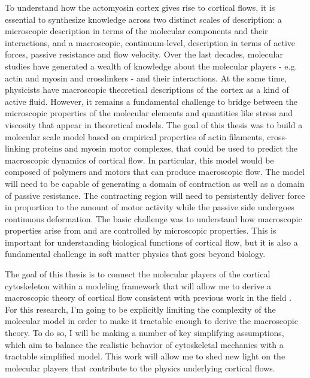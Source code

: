 To understand how the actomyosin cortex gives rise to cortical flows, it is essential to synthesize knowledge across two distinct scales of description: a microscopic description in terms of the molecular components and their interactions, and a macroscopic, continuum-level, description in terms of active forces, passive resistance and flow velocity. Over the last decades, molecular studies have generated a wealth of knowledge about the molecular players - e.g. actin and myosin and crosslinkers - and their interactions. At the same time, physicists have macroscopic theoretical descriptions of the cortex as a kind of active fluid\cite{cellmech_flows}. However, it remains a fundamental challenge to bridge between the microscopic properties of the molecular elements and quantities like stress and viscosity that appear in  theoretical models.  The goal of this thesis was to build  a molecular scale model based on empirical properties of actin filaments, cross-linking proteins and myosin motor complexes, that could be used to predict the macroscopic dynamics of cortical flow. In particular, this model would be composed of polymers and motors that can produce macroscopic flow. The model will need to be capable of generating a domain of contraction as well as a domain of passive resistance. The contracting region will need to persistently deliver force in proportion to the amount of motor activity while the passive side undergoes continuous deformation. The basic challenge was to understand how macroscopic properties arise from and are controlled by microscopic properties.  This is important for understanding biological functions of cortical flow,  but it is also a fundamental challenge in soft matter physics that goes beyond biology.

The goal of this thesis is to connect the molecular players of the cortical cytoskeleton within a modeling framework that will allow me to derive a macroscopic theory of cortical flow consistent with previous work in the field \cite{PhysRevLett.106.028103}. For this research, I'm going to be explicitly limiting the complexity of the molecular model in order to make it tractable enough to derive the macroscopic theory. To do so, I will be making a number of key simplifying assumptions, which aim to balance the realistic behavior of cytoskeletal mechanics with a tractable simplified model. This work will allow me to shed new light on the molecular players that contribute to the physics underlying cortical flows.


